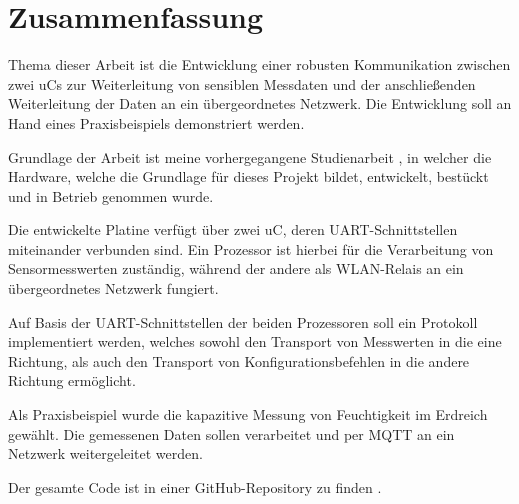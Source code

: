 \section*{Zusammenfassung}



Thema dieser Arbeit ist die Entwicklung einer robusten Kommunikation zwischen zwei \acp{uC} zur Weiterleitung von sensiblen Messdaten und 
der anschließenden Weiterleitung der Daten an ein übergeordnetes Netzwerk. Die Entwicklung soll an Hand eines Praxisbeispiels demonstriert werden.

\smallskip

Grundlage der Arbeit ist meine vorhergegangene Studienarbeit \citep{IoTGateway}, in welcher die Hardware,
welche die Grundlage für dieses Projekt bildet, entwickelt, bestückt und in Betrieb genommen wurde.

Die entwickelte Platine verfügt über zwei \acs{uC}, deren \acs{UART}-Schnittstellen miteinander verbunden sind. Ein Prozessor ist hierbei
für die Verarbeitung von Sensormesswerten zuständig, während der andere als \acs{WLAN}-Relais an ein übergeordnetes Netzwerk fungiert.

\smallskip

Auf Basis der \acs{UART}-Schnittstellen der beiden Prozessoren soll ein Protokoll implementiert werden, welches sowohl den Transport
von Messwerten in die eine Richtung, als auch den Transport von Konfigurationsbefehlen in die andere Richtung ermöglicht. 

Als Praxisbeispiel wurde die kapazitive Messung von Feuchtigkeit im Erdreich gewählt. Die gemessenen Daten sollen verarbeitet und
per \ac{MQTT} an ein Netzwerk weitergeleitet werden.

\smallskip

Der gesamte Code ist in einer GitHub-Repository zu finden \citep{Listing}.